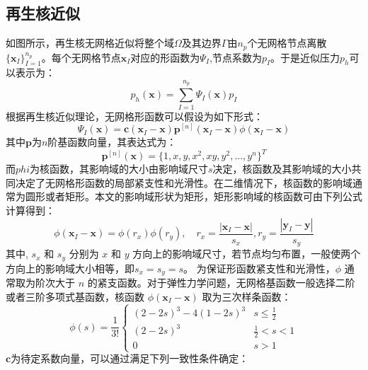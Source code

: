 \subsection{再生核近似}
如图所示，再生核无网格近似将整个域$\Omega$及其边界$\Gamma$由$n_p$个无网格节点离散$\{\boldsymbol x_I\}_{I=1}^{n_p}$。每个无网格节点$\boldsymbol x_I$对应的形函数为$\Psi_I$,节点系数为$p_I$。于是近似压力$p_h$可以表示为：
\begin{equation}
    p_h(\boldsymbol x) = \sum_{I=1}^{n_p} \Psi_I(\boldsymbol x) p_I
\end{equation}
根据再生核近似理论，无网格形函数可以假设为如下形式：
\begin{equation}\label{rkshape}
    \Psi_I(\boldsymbol x) = \boldsymbol c(\boldsymbol x_I-\boldsymbol x) \boldsymbol p^{[n]}(\boldsymbol x_I-\boldsymbol x) \phi(\boldsymbol x_I - \boldsymbol x)
\end{equation}
其中$\boldsymbol p$为$n$阶基函数向量，其表达式为：
\begin{equation}
    \boldsymbol p^{[n]}(\boldsymbol x) = \{ 1, x, y, x^2, xy, y^2,...,y^n\}^T
\end{equation}
而$phi$为核函数，其影响域的大小由影响域尺寸$s$决定，核函数及其影响域的大小共同决定了无网格形函数的局部紧支性和光滑性。在二维情况下，核函数的影响域通常为圆形或者矩形。本文的影响域形状为矩形，矩形影响域的核函数可由下列公式计算得到：
\begin{equation}
    \phi(\boldsymbol x_I-\boldsymbol x) = \phi(r_x) \phi(r_y), \quad r_x = \frac{|\boldsymbol x_I - \boldsymbol x|}{s_{x}},r_y = \frac{|\boldsymbol y_I - \boldsymbol y|}{s_{y}}
\end{equation}
其中, $s_x$ 和 $s_y$ 分别为 $x$ 和 $y$ 方向上的影响域尺寸，若节点均匀布置，一般使两个方向上的影响域大小相等，即$s_x = s_y = s$。
为保证形函数紧支性和光滑性，$\phi$ 通常取为阶次大于 $n$ 的紧支函数。对于弹性力学问题，无网格基函数一般选择二阶或者三阶多项式基函数，核函数 $\phi(\boldsymbol x_I-\boldsymbol x)$ 取为三次样条函数：
\begin{equation}
    \phi(s) =\frac{1}{3!} \begin{cases}
        (2-2s)^3 - 4(1-2s)^3 & s\le\frac{1}{2} \\
        (2-2s)^3 &\frac{1}{2}<s<1 \\
        0 & s> 1
    \end{cases}
\end{equation}
$\boldsymbol c$为待定系数向量，可以通过满足下列一致性条件确定：
